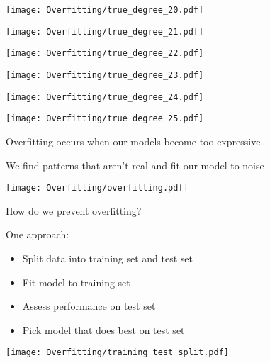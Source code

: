 \documentclass[xcolor=pdftex,dvipsnames,table]{beamer}
\begin{document}
\frame
{
	\begin{center}
		\texttt{[image: Overfitting/true\_degree\_20.pdf]}
	\end{center}
}

\frame
{
	\begin{center}
		\texttt{[image: Overfitting/true\_degree\_21.pdf]}
	\end{center}
}

\frame
{
	\begin{center}
		\texttt{[image: Overfitting/true\_degree\_22.pdf]}
	\end{center}
}

\frame
{
	\begin{center}
		\texttt{[image: Overfitting/true\_degree\_23.pdf]}
	\end{center}
}

\frame
{
	\begin{center}
		\texttt{[image: Overfitting/true\_degree\_24.pdf]}
	\end{center}
}

\frame
{
	\begin{center}
		\texttt{[image: Overfitting/true\_degree\_25.pdf]}
	\end{center}
}

\frame
{
	Overfitting occurs when our models become too expressive
}

\frame
{
	We find patterns that aren't real and fit our model to noise
}

\frame
{
	\begin{center}
		\texttt{[image: Overfitting/overfitting.pdf]}
	\end{center}
}

\frame
{
	How do we prevent overfitting?
}

\frame
{
	One approach:
	\begin{itemize}
		\item{Split data into training set and test set}
		\item{Fit model to training set}
		\item{Assess performance on test set}
		\item{Pick model that does best on test set}
	\end{itemize}
}

\frame
{
	\begin{center}
		\texttt{[image: Overfitting/training\_test\_split.pdf]}
	\end{center}
}
\end{document}
